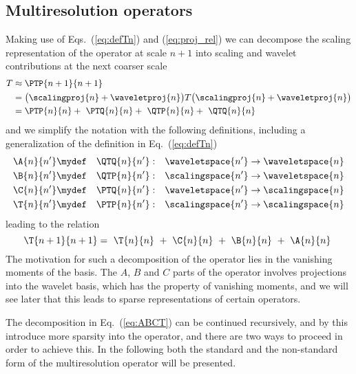 \subsection{Multiresolution operators}
Making use of Eqs.~(\ref{eq:defTn}) and (\ref{eq:proj_rel}) we can decompose the 
scaling representation of the operator at scale $n+1$ into scaling and wavelet contributions
at the next coarser scale
\begin{align}
    T	&\approx    \PTP{n+1}{n+1}\\
	&=	    \big(\scalingproj{n} + \waveletproj{n}\big) T 
		    \big(\scalingproj{n} + \waveletproj{n}\big)\\
	&=	    \PTP{n}{n} +\ \PTQ{n}{n} +\ \QTP{n}{n} +\ \QTQ{n}{n}
\end{align}
and we simplify the notation with the following definitions, including a 
generalization of the definition in Eq.~(\ref{eq:defTn})
\begin{eqnarray}
    \label{eq:defABCT}
    \begin{split}
    	\A{n}{n'} &\mydef& \QTQ{n}{n'}&:& \waveletspace{n'}\rightarrow \waveletspace{n}\\
	\B{n}{n'} &\mydef& \QTP{n}{n'}&:& \scalingspace{n'}\rightarrow \waveletspace{n}\\
	\C{n}{n'} &\mydef& \PTQ{n}{n'}&:& \waveletspace{n'}\rightarrow \scalingspace{n}\\
	\T{n}{n'} &\mydef& \PTP{n}{n'}&:& \scalingspace{n'}\rightarrow \scalingspace{n}
    \end{split}
\end{eqnarray}
leading to the relation
\begin{equation}
    \label{eq:ABCT}
    \T{n+1}{n+1} =\ \T{n}{n}\ +\ \C{n}{n}\ +\ \B{n}{n}\ +\ \A{n}{n}\ 
\end{equation} 
The motivation for such a decomposition of the operator lies in the vanishing moments
of the basis. The $A$, $B$ and $C$ parts of the operator involves projections into 
the wavelet basis, which has the property of vanishing moments, and we will see later
that this leads to sparse representations of certain operators.

The decomposition in Eq.~(\ref{eq:ABCT}) can be continued recursively, and by this 
introduce more sparsity into the operator, and there are two ways to proceed in order 
to achieve this. In the following both the standard and the non-standard form of the 
multiresolution operator will be presented.

